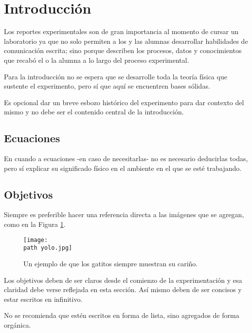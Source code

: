 \section*{Introducción}
\label{sec:Intro}

Los reportes experimentales son de gran importancia al momento de cursar un laboratorio ya que no solo permiten a los y las alumnas desarrollar habilidades de comunicación escrita; sino porque describen los procesos, datos y conocimientos que recabó el o la alumna a lo largo del proceso experimental.

Para la introducción no se espera que se desarrolle toda la teoría física que sustente el experimento, pero sí que aquí se encuentren bases sólidas. 

Es opcional dar un breve esbozo histórico del experimento para dar contexto del mismo y no debe ser el contenido central de la introducción.


\subsection*{Ecuaciones}
\label{subsec:Ecuaciones}

En cuando a ecuaciones -en caso de necesitarlas- no es necesario deducirlas todas, pero sí explicar su significado físico en el ambiente en el que se esté trabajando.

\subsection*{Objetivos}
\label{subsec:Objetivos}

Siempre es preferible hacer una referencia directa a las imágenes que se agregan, como en la Figura \ref{fig:Gatito}.

\begin{figure}[H]
	\centering
	\texttt{[image: \\path yolo.jpg]}
	\caption{Un ejemplo de que los gatitos siempre muestran su cariño.}
	\label{fig:Gatito}
\end{figure}

Los objetivos deben de ser claros desde el comienzo de la experimentación y esa claridad debe verse reflejada en esta sección. Así mismo deben de ser concisos y estar escritos en infinitivo.

No se recomienda que estén escritos en forma de lista, sino agregados de forma orgánica.